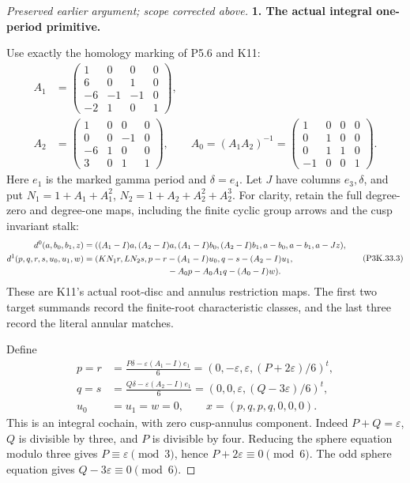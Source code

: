 \begin{proof}[Preserved earlier argument; scope corrected above]
\par\medskip\noindent\textbf{1. The actual integral one-period primitive.}\enspace

Use exactly the homology marking of P5.6 and K11:
\[
\begin{split}
 A_1&=\begin{pmatrix}
 1&0&0&0\\6&0&1&0\\-6&-1&-1&0\\-2&1&0&1
 \end{pmatrix},\\
 A_2&=\begin{pmatrix}
 1&0&0&0\\0&0&-1&0\\-6&1&0&0\\3&0&1&1
 \end{pmatrix},\qquad
 A_0=(A_1A_2)^{-1}
 =\begin{pmatrix}
 1&0&0&0\\0&1&0&0\\0&1&1&0\\-1&0&0&1
 \end{pmatrix}.
\end{split}                                                     \tag{P3K.33.2}
\]
Here \(e_1\) is the marked gamma period and \(\delta=e_4\).
Let \(J\) have columns \(e_3,\delta\), and put
\(N_1=1+A_1+A_1^2\), \(N_2=1+A_2+A_2^2+A_2^3\).
For clarity, retain the full degree-zero and degree-one maps,
including the finite cyclic group arrows and the cusp invariant stalk:
\[
\begin{split}
 d^0(a,b_0,b_1,z)={}&((A_1-I)a,(A_2-I)a,
 (A_1-I)b_0,(A_2-I)b_1,a-b_0,a-b_1,a-Jz),\\
 d^1(p,q,r,s,u_0,u_1,w)={}&(KN_1r,LN_2s,
 p-r-(A_1-I)u_0,q-s-(A_2-I)u_1,\\
 &\hspace{30mm}-A_0p-A_0A_1q-(A_0-I)w).
\end{split}                                                     \tag{P3K.33.3}
\]
These are K11's actual root-disc and annulus restriction maps.
The first two target summands record the finite-root characteristic
classes, and the last three record the literal annular matches.

Define
\[
\begin{split}
 p=r&=\frac{P\delta-\varepsilon(A_1-I)e_1}{6}
       =(0,-\varepsilon,\varepsilon,(P+2\varepsilon)/6)^t,\\
 q=s&=\frac{Q\delta-\varepsilon(A_2-I)e_1}{6}
       =(0,0,\varepsilon,(Q-3\varepsilon)/6)^t,\\
 u_0&=u_1=w=0,
 \qquad x=(p,q,p,q,0,0,0).
\end{split}                                                     \tag{P3K.33.4}
\]
This is an integral cochain, with zero cusp-annulus component.
Indeed \(P+Q=\varepsilon\), \(Q\) is divisible by three, and \(P\)
is divisible by four. Reducing the sphere equation modulo three
gives \(P\equiv\varepsilon\pmod3\), hence
\(P+2\varepsilon\equiv0\pmod6\). The odd sphere equation
gives \(Q-3\varepsilon\equiv0\pmod6\).


\end{proof}
